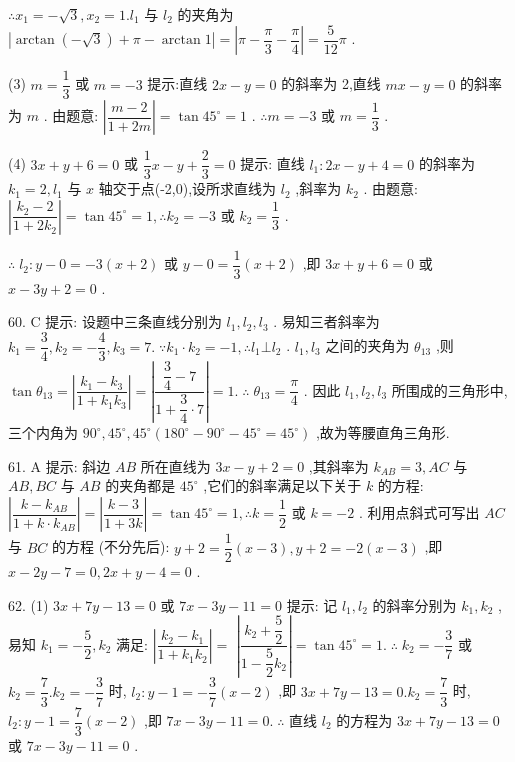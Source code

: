 $\therefore {x}_{1} =  - \sqrt{3},{x}_{2} = 1.{l}_{1}$ 与 ${l}_{2}$ 的夹角为 $\left| {\arctan \left( {-\sqrt{3}}\right)  + \pi  - \arctan 1}\right|  = \left| {\pi  - \dfrac{\pi }{3} - \dfrac{\pi }{4}}\right|  = \dfrac{5}{12}\pi$ .

(3) $m = \dfrac{1}{3}$ 或 $m =  - 3$ 提示:直线 ${2x} - y = 0$ 的斜率为 2,直线 ${mx} - y = 0$ 的斜率为 $m$ . 由题意: $\left| \dfrac{m - 2}{1 + {2m}}\right|  = \tan {45}^{ \circ  } = 1$ . $\therefore m =  - 3$ 或 $m = \dfrac{1}{3}$ .

(4) ${3x} + y + 6 = 0$ 或 $\dfrac{1}{3}x - y + \dfrac{2}{3} = 0$ 提示: 直线 ${l}_{1} : {2x} - y + 4 = 0$ 的斜率为 ${k}_{1} = 2,{l}_{1}$ 与 $x$ 轴交于点(-2,0),设所求直线为 ${l}_{2}$ ,斜率为 ${k}_{2}$ . 由题意: $\left| \dfrac{{k}_{2} - 2}{1 + 2{k}_{2}}\right|  = \tan {45}^{ \circ  } = 1,\therefore {k}_{2} =  - 3$ 或 ${k}_{2} = \dfrac{1}{3}$ .

$\therefore \;{l}_{2} : y - 0 =  - 3\left( {x + 2}\right)$ 或 $y - 0 = \dfrac{1}{3}\left( {x + 2}\right)$ ,即 ${3x} + y + 6 = 0$ 或 $x - {3y} + 2 = 0$ .

60. C 提示: 设题中三条直线分别为 ${l}_{1},{l}_{2},{l}_{3}$ . 易知三者斜率为 ${k}_{1} = \dfrac{3}{4},{k}_{2} =  - \dfrac{4}{3},{k}_{3} = 7.\;\because {k}_{1} \cdot  {k}_{2} =  - 1,\therefore {l}_{1} \bot  {l}_{2}$ . ${l}_{1},{l}_{3}$ 之间的夹角为 ${\theta }_{13}$ ,则 $\tan {\theta }_{13} = \left| \dfrac{{k}_{1} - {k}_{3}}{1 + {k}_{1}{k}_{3}}\right|  = \left| \dfrac{\dfrac{3}{4} - 7}{1 + \dfrac{3}{4} \cdot  7}\right|  = 1.\;\therefore \;{\theta }_{13} = \dfrac{\pi }{4}$ . 因此 ${l}_{1},{l}_{2},{l}_{3}$ 所围成的三角形中,三个内角为 ${90}^{ \circ  },{45}^{ \circ  },{45}^{ \circ  }\left( {{180}^{ \circ  } - {90}^{ \circ  } - {45}^{ \circ  } = {45}^{ \circ  }}\right)$ ,故为等腰直角三角形.

61. A 提示: 斜边 ${AB}$ 所在直线为 ${3x} - y + 2 = 0$ ,其斜率为 ${k}_{AB} = 3,{AC}$ 与 ${AB},{BC}$ 与 ${AB}$ 的夹角都是 ${45}^{ \circ  }$ ,它们的斜率满足以下关于 $k$ 的方程: $\left| \dfrac{k - {k}_{AB}}{1 + k \cdot  {k}_{AB}}\right|  = \left| \dfrac{k - 3}{1 + {3k}}\right|  = \tan {45}^{ \circ  } = 1,\therefore k = \dfrac{1}{2}$ 或 $k =  - 2$ . 利用点斜式可写出 ${AC}$ 与 ${BC}$ 的方程 (不分先后): $y + 2 = \dfrac{1}{2}\left( {x - 3}\right) ,y + 2 =  - 2\left( {x - 3}\right)$ ,即 $x - {2y} - 7 = 0,{2x} + y - 4 = 0$ .

62. (1) ${3x} + {7y} - {13} = 0$ 或 ${7x} - {3y} - {11} = 0$ 提示: 记 ${l}_{1},{l}_{2}$ 的斜率分别为 ${k}_{1},{k}_{2}$ ,易知 ${k}_{1} =  - \dfrac{5}{2},{k}_{2}$ 满足: $\left| \dfrac{{k}_{2} - {k}_{1}}{1 + {k}_{1}{k}_{2}}\right|  =$  $\left| \dfrac{{k}_{2} + \dfrac{5}{2}}{1 - \dfrac{5}{2}{k}_{2}}\right|  = \tan {45}^{ \circ  } = 1.\;\therefore \;{k}_{2} =  - \dfrac{3}{7}$ 或 ${k}_{2} = \dfrac{7}{3}.{k}_{2} =  - \dfrac{3}{7}$ 时, ${l}_{2} : y - 1 =  - \dfrac{3}{7}\left( {x - 2}\right)$ ,即 ${3x} + {7y} - {13} = 0.{k}_{2} = \dfrac{7}{3}$ 时, ${l}_{2} : y - 1 = \dfrac{7}{3}\left( {x - 2}\right)$ ,即 ${7x} - {3y} - {11} = 0.\;\therefore$ 直线 ${l}_{2}$ 的方程为 ${3x} + {7y} - {13} = 0$ 或 ${7x} - {3y} - {11} = 0$ .

